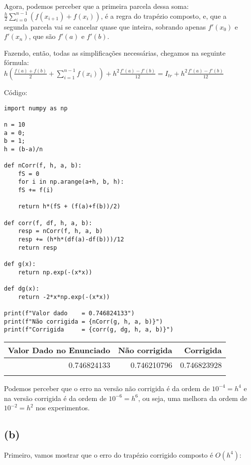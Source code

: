 \documentclass[11pt]{article}
\begin{document}
Agora, podemos perceber que a primeira parcela dessa soma: \\
\(\displaystyle\frac{h}{2}\sum_{i=0}^{n-1}(f(x_{i+1})+f(x_i))\),
é a regra do trapézio composto, e, que a segunda parcela vai se cancelar quase que inteira, sobrando apenas 
\(f'(x_0)\) e \(f'(x_n)\), que são \(f'(a)\) e \(f'(b)\). 

Fazendo, então, todas as simplificações necessárias, chegamos na seguinte fórmula: \\

\(\displaystyle h(\frac{f(a)+f(b)}{2}+\sum_{i=1}^{n-1}f(x_i)) + h^2\frac{f'(a)-f'(b)}{12} = I_{tr} + h^2\frac{f'(a)-f'(b)}{12}\)

\newpage

Código: 
\begin{verbatim}
import numpy as np

n = 10
a = 0;
b = 1;
h = (b-a)/n

def nCorr(f, h, a, b):
    fS = 0
    for i in np.arange(a+h, b, h):
	fS += f(i)

    return h*(fS + (f(a)+f(b))/2)

def corr(f, df, h, a, b):
    resp = nCorr(f, h, a, b)
    resp += (h*h*(df(a)-df(b)))/12
    return resp

def g(x):
    return np.exp(-(x*x))

def dg(x):
    return -2*x*np.exp(-(x*x))

print(f"Valor dado    = 0.746824133")
print(f"Não corrigida = {nCorr(g, h, a, b)}")
print(f"Corrigida     = {corr(g, dg, h, a, b)}")
\end{verbatim}

\begin{center}
\begin{tabular}{rrr}
Valor Dado no Enunciado & Não corrigida & Corrigida\\
\hline
0.746824133 & 0.746210796 & 0.746823928\\
 &  & \\
\end{tabular}
\end{center}

Podemos perceber que o erro na versão não corrigida é da ordem de \(10^{-4} = h^4\) e
na versão corrigida é da ordem de \(10^{-6} = h^6\), ou seja, uma melhora da ordem de \(10^{-2} = h^2\) nos experimentos.
\newpage
\subsection{(b)}
\label{sec:org8fc3a7d}
Primeiro, vamos mostrar que o erro do trapézio corrigido composto 
é \(O(h^4)\):
\end{document}
